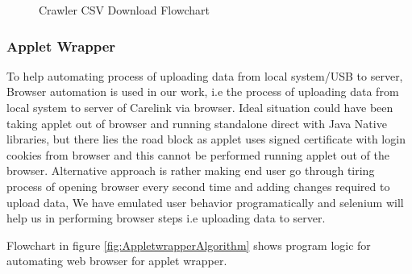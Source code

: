 \documentclass[article,type=msc,colorback,accentcolor=tud9c,twoside,11pt]{tudthesis}
\begin{document}
\begin{center}
\begin{figure}[h!]
  \caption{Crawler CSV Download Flowchart}
  \label{fig:CrawlerCSVAlgorithm}
\end{figure}
\end{center}
\subsubsection{Applet Wrapper}
\label{subsec:AppletWrapper}
To help automating process of uploading data from local system/USB to server, Browser automation is used in our work, i.e the process of uploading data from local system to server of Carelink via browser. Ideal situation could have been taking applet out of browser and running standalone direct with Java Native libraries, but there lies the road block as applet uses signed certificate with login cookies from browser and this cannot be performed running applet out of the browser. Alternative approach is rather making end user go through tiring process of opening browser every second time and adding changes required to upload data, We have emulated user behavior programatically and selenium will help us in performing browser steps i.e uploading data to server. 

Flowchart in figure \ref{fig:AppletwrapperAlgorithm} shows  program logic for automating web browser for applet wrapper.
\end{document}
